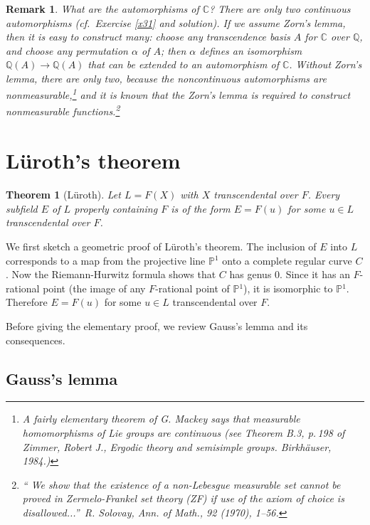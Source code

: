 \documentclass[a4paper,11pt,final,openany]{memoir}
\newtheorem{theorem}[X]{Theorem}
\newtheorem{remark}[X]{Remark}
\theoremstyle{nonumberplain}
\begin{document}
\begin{remark}
\label{te16}What are the automorphisms of $\mathbb{C}$? There are only two
continuous automorphisms (cf.\ Exercise \ref{x31} and solution). If we assume
Zorn's lemma, then it is easy to construct many: choose any transcendence
basis $A$ for $\mathbb{C}$ over $\mathbb{Q}$, and choose any permutation
$\alpha$ of $A$; then $\alpha$ defines an isomorphism $\mathbb{Q}%
(A)\rightarrow\mathbb{Q}(A)$ that can be extended to an automorphism of
$\mathbb{C}$. Without Zorn's lemma, there are only two, because the
noncontinuous automorphisms are nonmeasurable,\footnote{A fairly elementary
theorem of G. Mackey says that measurable homomorphisms of Lie groups are
continuous (see Theorem B.3, p.\,198 of Zimmer, Robert J., Ergodic theory and
semisimple groups. Birkh\"auser, 1984.)} and it is known that the Zorn's lemma
is required to construct nonmeasurable functions.\footnote{\textquotedblleft
We show that the existence of a non-Lebesgue measurable set cannot be proved
in Zermelo-Frankel set theory (ZF) if use of the axiom of choice is
disallowed...\textquotedblright\ R. Solovay, Ann. of Math., 92 (1970), 1--56.}
\end{remark}

\section{L\"{u}roth's theorem}

\begin{theorem}
[L\"{u}roth]\label{te17}Let $L=F(X)$ with $X$ transcendental over $F$. Every
subfield $E$ of $L$ properly containing $F$ is of the form $E=F(u)$ for some
$u\in L$ transcendental over $F$.
\end{theorem}

We first sketch a geometric proof of L\"{u}roth's theorem. The inclusion of
$E$ into $L$ corresponds to a map from the projective line $\mathbb{P}{}^{1}$
onto a complete regular curve $C$. Now the Riemann-Hurwitz formula shows that
$C$ has genus $0$. Since it has an $F$-rational point (the image of any
$F$-rational point of $\mathbb{P}{}^{1}$), it is isomorphic to $\mathbb{P}%
{}^{1}$. Therefore $E=F(u)$ for some $u\in L$ transcendental over $F$.

Before giving the elementary proof, we review Gauss's lemma and its consequences.

\subsection{Gauss's lemma}
\end{document}
